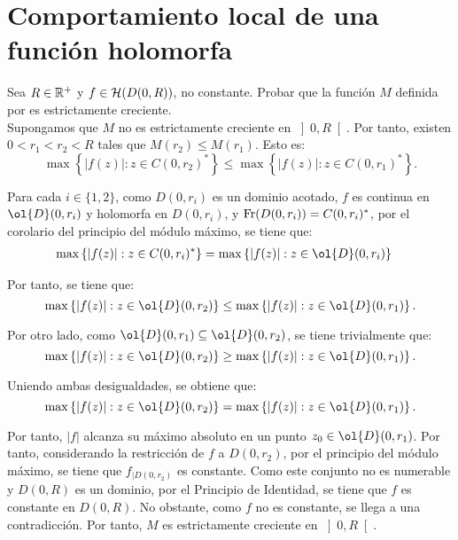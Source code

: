 \section{Comportamiento local de una función holomorfa}

\begin{ejercicio}
    Sea $R\in \mathbb{R}^+$ y $f\in \mathcal{H}(D(0,R))$, no constante. Probar que la función $M$ definida por
    \Func{M}{\left]0,R\right[}{\bb{R}}{r}{\max\left\{ |f(z)| : z\in C(0,r)^* \right\}}
    es estrictamente creciente.\\

    Supongamos que $M$ no es estrictamente creciente en $\left]0,R\right[$. Por tanto, existen $0 < r_1 < r_2 < R$ tales que $M(r_2)\leq M(r_1)$. Esto es:
    \begin{equation*}
        \max\left\{ |f(z)| : z\in C(0,r_2)^* \right\} \leq \max\left\{ |f(z)| : z\in C(0,r_1)^* \right\}.
    \end{equation*}

    Para cada $i\in \{1,2\}$, como $D(0,r_i)$ es un dominio acotado, $f$ es continua en $\ol{D}(0,r_i)$ y holomorfa en $D(0,r_i)$, y $\operatorname{Fr}(D(0,r_i)) = C(0,r_i)^*$, por el corolario del principio del módulo máximo, se tiene que:
    \begin{align*}
        \max\left\{ |f(z)| : z\in C(0,r_i)^* \right\} &= \max\left\{ |f(z)| : z\in \ol{D}(0,r_i) \right\}
    \end{align*}

    Por tanto, se tiene que:
    \begin{equation*}
        \max\left\{ |f(z)| : z\in \ol{D}(0,r_2) \right\} \leq \max\left\{ |f(z)| : z\in \ol{D}(0,r_1) \right\}.
    \end{equation*}

    Por otro lado, como $\ol{D}(0,r_1) \subseteq \ol{D}(0,r_2)$, se tiene trivialmente que:
    \begin{equation*}
        \max\left\{ |f(z)| : z\in \ol{D}(0,r_2) \right\} \geq \max\left\{ |f(z)| : z\in \ol{D}(0,r_1) \right\}.
    \end{equation*}

    Uniendo ambas desigualdades, se obtiene que:
    \begin{equation*}
        \max\left\{ |f(z)| : z\in \ol{D}(0,r_2) \right\} = \max\left\{ |f(z)| : z\in \ol{D}(0,r_1) \right\}.
    \end{equation*}

    Por tanto, $|f|$ alcanza su máximo absoluto en un punto $z_0\in \ol{D}(0,r_1)$. Por tanto, considerando la restricción de $f$ a $D(0,r_2)$, por el principio del módulo máximo, se tiene que $f_{\big|D(0,r_2)}$ es constante. Como este conjunto no es numerable y $D(0,R)$ es un dominio, por el Principio de Identidad, se tiene que $f$ es constante en $D(0,R)$. No obstante, como $f$ no es constante, se llega a una contradicción. Por tanto, $M$ es estrictamente creciente en $\left]0,R\right[$.
\end{ejercicio}

